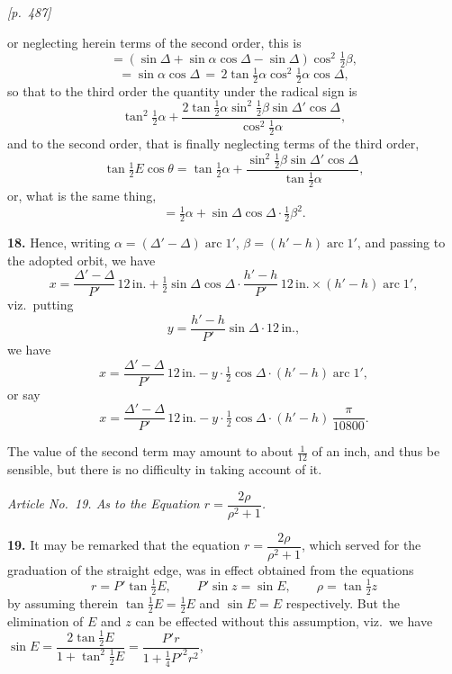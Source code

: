\documentclass[11pt]{article}
\begin{document}
\medskip

\noindent\textit{[p.~487]}

\medskip

or neglecting herein terms of the second order, this is
\[
= (\sin\Delta + \sin\alpha\cos\Delta - \sin\Delta)\cos^{2}\tfrac{1}{2}\beta,
\]
\[
= \sin\alpha\cos\Delta\, = \, 2\tan\tfrac{1}{2}\alpha\cos^{2}\tfrac{1}{2}\alpha\cos\Delta,
\]
so that to the third order the quantity under the radical sign is
\[
\tan^{2}\tfrac{1}{2}\alpha + \frac{2\tan\tfrac{1}{2}\alpha\sin^{2}\tfrac{1}{2}\beta\sin\Delta'\cos\Delta}{\cos^{2}\tfrac{1}{2}\alpha},
\]
and to the second order, that is finally neglecting terms of the third
order,
\[
\tan\tfrac{1}{2}E\cos\theta = \tan\tfrac{1}{2}\alpha + \frac{\sin^{2}\tfrac{1}{2}\beta\sin\Delta'\cos\Delta}{\tan\tfrac{1}{2}\alpha},
\]
or, what is the same thing,
\[
= \tfrac{1}{2}\alpha + \sin\Delta\cos\Delta\cdot\tfrac{1}{2}\beta^{2}.
\]

\medskip

\textbf{18.} Hence, writing $\alpha = (\Delta'-\Delta)\operatorname{arc}1'$,
$\beta = (h'-h)\operatorname{arc}1'$, and passing to the adopted orbit, we
have
\[
x = \frac{\Delta'-\Delta}{P'}\,12\,\text{in.} + \tfrac{1}{2}\sin\Delta\cos\Delta\cdot\frac{h'-h}{P'}\,12\,\text{in.}\times(h'-h)\operatorname{arc}1',
\]
viz.\ putting
\[
y = \frac{h'-h}{P'}\sin\Delta\cdot 12\,\text{in.},
\]
we have
\[
x = \frac{\Delta'-\Delta}{P'}\,12\,\text{in.} - y\cdot\tfrac{1}{2}\cos\Delta\cdot(h'-h)\operatorname{arc}1',
\]
or say
\[
x = \frac{\Delta'-\Delta}{P'}\,12\,\text{in.} - y\cdot\tfrac{1}{2}\cos\Delta\cdot(h'-h)\,\frac{\pi}{10800}.
\]

The value of the second term may amount to about $\tfrac{1}{12}$ of an
inch, and thus be sensible, but there is no difficulty in taking account
of it.

\medskip

\begin{center}
\textit{Article No.\ 19. As to the Equation $r = \dfrac{2\rho}{\rho^{2}+1}$.}
\end{center}

\medskip

\textbf{19.} It may be remarked that the equation
$r = \dfrac{2\rho}{\rho^{2}+1}$, which served for the graduation of the
straight edge, was in effect obtained from the equations
\[
r = P'\tan\tfrac{1}{2}E,\qquad P'\sin z = \sin E,\qquad \rho = \tan\tfrac{1}{2}z
\]
by assuming therein $\tan\tfrac{1}{2}E = \tfrac{1}{2}E$ and $\sin E = E$
respectively. But the elimination of $E$ and $z$ can be effected without
this assumption, viz.\ we have
$\sin E = \dfrac{2\tan\tfrac{1}{2}E}{1+\tan^{2}\tfrac{1}{2}E} = \dfrac{P'r}{1+\tfrac{1}{4}P'^{2}r^{2}}$,
\end{document}
